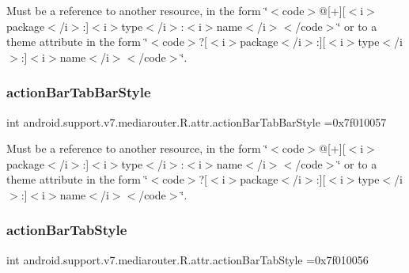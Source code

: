 Must be a reference to another resource, in the form \char`\"{}$<$code$>$@\mbox{[}+\mbox{]}\mbox{[}$<$i$>$package$<$/i$>$\+:\mbox{]}$<$i$>$type$<$/i$>$\+:$<$i$>$name$<$/i$>$$<$/code$>$\char`\"{} or to a theme attribute in the form \char`\"{}$<$code$>$?\mbox{[}$<$i$>$package$<$/i$>$\+:\mbox{]}\mbox{[}$<$i$>$type$<$/i$>$\+:\mbox{]}$<$i$>$name$<$/i$>$$<$/code$>$\char`\"{}. \mbox{\label{classandroid_1_1support_1_1v7_1_1mediarouter_1_1R_1_1attr_a40306e1def683ac3a79c6cee5eac1e11}} 
\subsubsection{\texorpdfstring{action\+Bar\+Tab\+Bar\+Style}{actionBarTabBarStyle}}
{\footnotesize\ttfamily int android.\+support.\+v7.\+mediarouter.\+R.\+attr.\+action\+Bar\+Tab\+Bar\+Style =0x7f010057\hspace{0.3cm}{\ttfamily [static]}}

Must be a reference to another resource, in the form \char`\"{}$<$code$>$@\mbox{[}+\mbox{]}\mbox{[}$<$i$>$package$<$/i$>$\+:\mbox{]}$<$i$>$type$<$/i$>$\+:$<$i$>$name$<$/i$>$$<$/code$>$\char`\"{} or to a theme attribute in the form \char`\"{}$<$code$>$?\mbox{[}$<$i$>$package$<$/i$>$\+:\mbox{]}\mbox{[}$<$i$>$type$<$/i$>$\+:\mbox{]}$<$i$>$name$<$/i$>$$<$/code$>$\char`\"{}. \mbox{\label{classandroid_1_1support_1_1v7_1_1mediarouter_1_1R_1_1attr_a092c66e5f0954d506b706e77e70ed366}} 
\subsubsection{\texorpdfstring{action\+Bar\+Tab\+Style}{actionBarTabStyle}}
{\footnotesize\ttfamily int android.\+support.\+v7.\+mediarouter.\+R.\+attr.\+action\+Bar\+Tab\+Style =0x7f010056\hspace{0.3cm}{\ttfamily [static]}}

